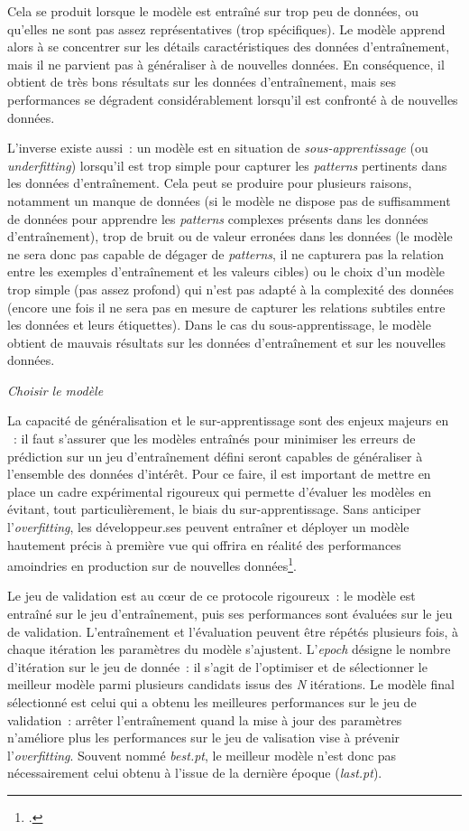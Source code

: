Cela se produit lorsque le modèle est entraîné sur trop peu de données,
ou qu'elles ne sont pas assez représentatives (trop spécifiques). Le
modèle apprend alors à se concentrer sur les détails caractéristiques
des données d'entraînement, mais il ne parvient pas à généraliser à de
nouvelles données. En conséquence, il obtient de très bons résultats sur
les données d'entraînement, mais ses performances se dégradent
considérablement lorsqu'il est confronté à de nouvelles données.

L'inverse existe aussi~: un modèle est en situation de
\emph{sous-apprentissage} (ou \emph{underfitting}) lorsqu'il est trop
simple pour capturer les \textit{patterns} pertinents dans les données
d'entraînement. Cela peut se produire pour plusieurs raisons, notamment
un manque de données (si le modèle ne dispose pas de suffisamment de
données pour apprendre les \textit{patterns} complexes présents dans les données
d'entraînement), trop de bruit ou de valeur erronées dans les données
(le modèle ne sera donc pas capable de dégager de \textit{patterns}, il ne
capturera pas la relation entre les exemples d'entraînement et les
valeurs cibles) ou le choix d'un modèle trop simple (pas assez profond)
qui n'est pas adapté à la complexité des données (encore une fois il ne
sera pas en mesure de capturer les relations subtiles entre les données
et leurs étiquettes). Dans le cas du sous-apprentissage, le modèle
obtient de mauvais résultats sur les données d'entraînement et sur les
nouvelles données.

\emph{Choisir le modèle}

La capacité de généralisation et le sur-apprentissage sont des enjeux
majeurs en \ml~: il faut s'assurer que les modèles
entraînés pour minimiser les erreurs de prédiction sur un jeu
d'entraînement défini seront capables de généraliser à l'ensemble des
données d'intérêt. Pour ce faire, il est important de mettre en place un
cadre expérimental rigoureux qui permette d'évaluer les modèles en
évitant, tout particulièrement, le biais du sur-apprentissage. Sans
anticiper l'\textit{overfitting}, les développeur.ses peuvent entraîner et déployer
un modèle hautement précis à première vue qui offrira en réalité des
performances amoindries en production sur de nouvelles
données\footcite[p.32]{azencott_introduction_2022}.

Le jeu de validation est au cœur de ce protocole rigoureux~: le
modèle est entraîné sur le jeu d'entraînement, puis ses performances
sont évaluées sur le jeu de validation. L'entraînement et l'évaluation
peuvent être répétés plusieurs fois, à chaque itération les paramètres du
modèle s'ajustent. L'\emph{epoch} désigne le nombre d'itération sur le
jeu de donnée~: il s'agit de l'optimiser et de sélectionner le meilleur
modèle parmi plusieurs candidats issus des \emph{N} itérations. Le
modèle final sélectionné est celui qui a obtenu les meilleures
performances sur le jeu de validation~: arrêter l'entraînement quand la
mise à jour des paramètres n'améliore plus les performances sur le jeu
de valisation vise à prévenir l'\textit{overfitting}. Souvent nommé
\emph{best.pt}, le meilleur modèle n'est donc pas nécessairement celui
obtenu à l'issue de la dernière époque (\emph{last.pt}).

